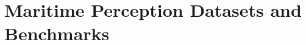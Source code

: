 \documentclass{erauthesis}
\begin{document}




\section{Maritime Perception Datasets and Benchmarks}
\end{document}
